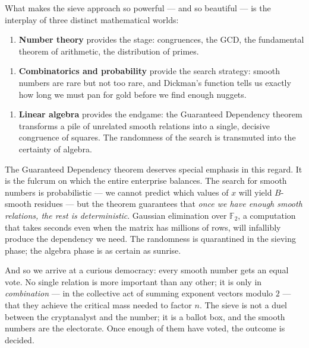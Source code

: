 \documentclass[11pt,openany]{book}
\theoremstyle{definition}
\theoremstyle{plain}
\theoremstyle{remark}
\begin{document}
What makes the sieve approach so powerful — and so beautiful — is the interplay of three distinct mathematical worlds:

\begin{enumerate}
\item \textbf{Number theory} provides the stage: congruences, the GCD, the fundamental theorem of arithmetic, the distribution of primes.
\end{enumerate}

\begin{enumerate}
\item \textbf{Combinatorics and probability} provide the search strategy: smooth numbers are rare but not too rare, and Dickman's function tells us exactly how long we must pan for gold before we find enough nuggets.
\end{enumerate}

\begin{enumerate}
\item \textbf{Linear algebra} provides the endgame: the Guaranteed Dependency theorem transforms a pile of unrelated smooth relations into a single, decisive congruence of squares. The randomness of the search is transmuted into the certainty of algebra.
\end{enumerate}

The Guaranteed Dependency theorem deserves special emphasis in this regard. It is the fulcrum on which the entire enterprise balances. The search for smooth numbers is probabilistic — we cannot predict which values of $x$ will yield $B$-smooth residues — but the theorem guarantees that \textit{once we have enough smooth relations, the rest is deterministic}. Gaussian elimination over $\mathbb{F}_2$, a computation that takes seconds even when the matrix has millions of rows, will infallibly produce the dependency we need. The randomness is quarantined in the sieving phase; the algebra phase is as certain as sunrise.

And so we arrive at a curious democracy: every smooth number gets an equal vote. No single relation is more important than any other; it is only in \textit{combination} — in the collective act of summing exponent vectors modulo $2$ — that they achieve the critical mass needed to factor $n$. The sieve is not a duel between the cryptanalyst and the number; it is a ballot box, and the smooth numbers are the electorate. Once enough of them have voted, the outcome is decided.
\end{document}
